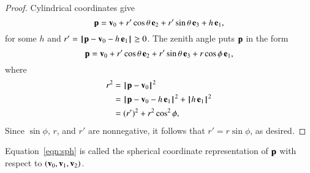 \begin{proof}
Cylindrical coordinates give
\[ 
{\mathbf p} = {\mathbf v}_0 + r'\cos\theta\,{\mathbf e}_2 + r'\sin\theta\,{\mathbf e}_3 + h\, {\mathbf e}_1,
\] 
for some $h$ and $r'={{\hskip0.1em|\hskip-0.15em|\hskip0.1em}{\mathbf p}-{\mathbf v}_0-h\,{\mathbf e}_1{\hskip0.1em|\hskip-0.15em|\hskip0.1em}}\ge0$.  The zenith angle
puts ${\mathbf p}$ in the form
\[ 
{\mathbf p} = {\mathbf v}_0 + r'\cos\theta\,{\mathbf e}_2 + r'\sin\theta\,{\mathbf e}_3 + r\cos\phi\, {\mathbf e}_1,
\] 
where
\begin{align*}
r^2 &= \norm{\p}{\v_0}^2\\ 
&= \normo{\p-\v_0-h\,\e_1}^2 + \normo{h\,\e_1}^2\\
&= (r')^2 + r^2 \cos^2\phi,
\end{align*}
Since $\sin\phi$, $r$, and $r'$ are nonnegative, it follows that $r'=r\sin\phi$, as
desired.
\end{proof}

\begin{definition}\label{def:sph}
  Equation~\eqref{eqn:sph} is called the spherical coordinate representation of ${\mathbf p}$ with
  respect to $({\mathbf v}_0,{\mathbf v}_1,{\mathbf v}_2)$.
\end{definition}



%


